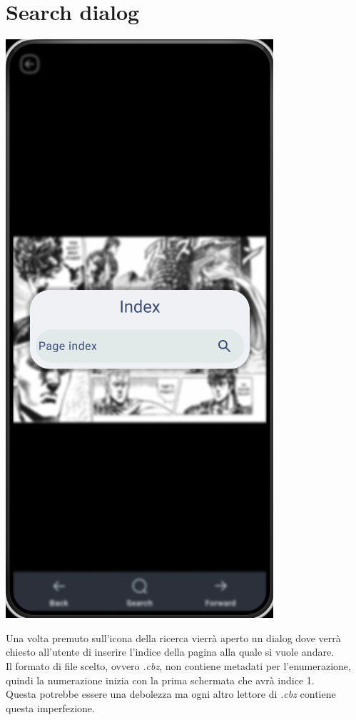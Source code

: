 \documentclass{report}
\begin{document}
\section{Search dialog}

\begin{center}
   \includegraphics[scale=0.4]{search_dialog.png}
\end{center}

Una volta premuto sull'icona della ricerca vierrà aperto un dialog dove verrà chiesto all'utente di inserire l'indice della pagina alla quale si vuole andare.\\
Il formato di file scelto, ovvero \emph{.cbz}, non contiene metadati per l'enumerazione, quindi la numerazione inizia con la prima schermata che avrà indice 1.\\
Questa potrebbe essere una debolezza ma ogni altro lettore di \emph{.cbz} contiene questa imperfezione.
\end{document}
